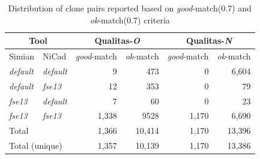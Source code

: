 \documentclass{IEEEtran}
\begin{document}
\begin{table}[H]
	\centering
	\caption{Distribution of clone pairs reported based on \textit{good}-match(0.7) and \textit{ok}-match(0.7) criteria}
	\label{t_agreed_good_clone_pairs}
	\begin{tabular}{l|l|r|r|r|r}
		\hline
		\multicolumn{2}{c|}{Tool} & \multicolumn{2}{c|}{Qualitas-\textit{O}} & \multicolumn{2}{c}{Qualitas-\textit{N}} \\
		\hline
		Simian & NiCad & \textit{good}-match & \textit{ok}-match & \textit{good}-match & \textit{ok}-match \\
		\hline
		\textit{default} & \textit{default} & 9 	& 473 	& 0 & 6,604 \\ 
		\textit{default} & \textit{fse13} 	& 12 	& 353 	& 0 & 79 \\ 
		\textit{fse13} 	& \textit{default} 	& 7 	& 60 	& 0 & 23 \\
		\textit{fse13} 	& \textit{fse13} 	& 1,338 & 9528 & 1,170 & 6,690 \\ 
		\hline
		\multicolumn{2}{l|}{Total} & 1,366 & 10,414 & 1,170 & 13,396 \\
		\multicolumn{2}{l|}{Total (unique)} & 1,357 & 10,139 & 1,170 & 13,386 \\
		\hline
	\end{tabular}
\end{table}
\end{document}

